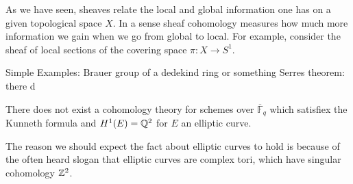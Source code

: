 As we have seen, sheaves relate the local and global information one has on a given topological space $X$. In a sense sheaf cohomology measures how much more information we gain when we go from global to local. For example, consider the sheaf of local sections of the covering space $\pi : X \to S^1$.
%
%
%




Simple Examples:
Brauer group of a dedekind ring or something
Serres theorem: there d
\begin{theorem}
	There does not exist a cohomology theory for schemes over $\overline{\mathbb{F}}_q$ which satisfiex the Kunneth formula and $H^1(E) = \mathbb{Q}^2$ for $E$ an elliptic curve.
\end{theorem}
The reason we should expect the fact about elliptic curves to hold is because of the often heard slogan that elliptic curves are complex tori, which have singular cohomology $\mathbb{Z}^2$.
